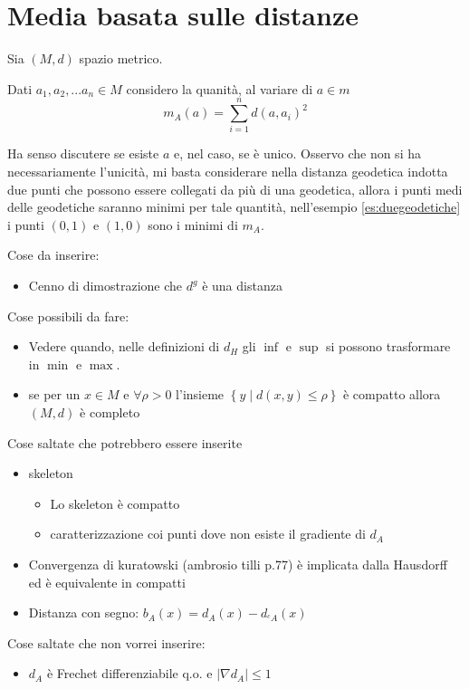 \documentclass[a4paper,10pt]{article}
\theoremstyle{plain}
\theoremstyle{definition}
\theoremstyle{remark}
\newcommand{\set}[1]{\left\{#1\right\}}
\newcommand{\abs}[1]{\left|#1\right|}
\begin{document}
\section{Media basata sulle distanze}

Sia $(M,d)$ spazio metrico.

Dati $a_1,a_2,... a_n \in M$ considero la quanità, al variare di $a
\in m$
\[ m_A (a) = \sum _{i = 1} ^n d(a,a_i)^2 \]

Ha senso discutere se esiste $a$ e, nel caso, se è unico. Osservo che
non si ha necessariamente l'unicità, mi basta considerare nella
distanza geodetica indotta due punti che possono essere collegati da
più di una geodetica, allora i punti medi delle geodetiche saranno
minimi per tale quantità, nell'esempio \ref{es:duegeodetiche} i punti
$(0,1)$ e $(1,0)$ sono i minimi di $m_A$.

\newpage





\newpage

Cose da inserire:
\begin{itemize}
\item Cenno di dimostrazione che $d^g$ è una distanza
\end{itemize}

Cose possibili da fare:

\begin{itemize}
\item Vedere quando, nelle definizioni di $d_H$ gli $\inf$ e $\sup$ si
  possono trasformare in $\min$ e $\max$.
\item se per un $x \in M$ e $\forall \rho > 0$ l'insieme $\set{ y \mid
    d(x,y) \le \rho}$ è compatto allora $(M,d)$ è completo
\end{itemize}


Cose saltate che potrebbero essere inserite
\begin{itemize}
\item skeleton
  \begin{itemize}
  \item Lo skeleton è compatto
  \item caratterizzazione coi punti dove non esiste il gradiente di
    $d_A$
  \end{itemize}
\item Convergenza di kuratowski (ambrosio tilli p.77) è implicata
  dalla Hausdorff ed è equivalente in compatti
\item Distanza con segno: $b_A(x) = d_A(x) - d_{^cA}(x)$
\end{itemize}


Cose saltate che non vorrei inserire:
\begin{itemize}
\item $d_A$ è Frechet differenziabile q.o. e $\abs{\nabla d_A} \le 1$
\end{itemize}
\end{document}
